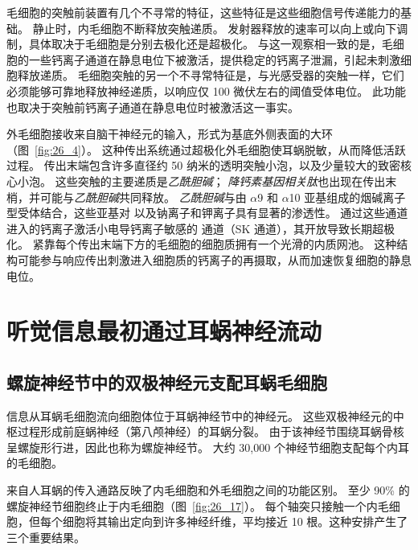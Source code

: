 毛细胞的突触前装置有几个不寻常的特征，这些特征是这些细胞信号传递能力的基础。
静止时，内毛细胞不断释放突触递质。
发射器释放的速率可以向上或向下调制，具体取决于毛细胞是分别去极化还是超极化。
与这一观察相一致的是，毛细胞的一些钙离子通道在静息电位下被激活，提供稳定的钙离子泄漏，引起未刺激细胞释放递质。
毛细胞突触的另一个不寻常特征是，与光感受器的突触一样，它们必须能够可靠地释放神经递质，以响应仅 100 微伏左右的阈值受体电位。
此功能也取决于突触前钙离子通道在静息电位时被激活这一事实。


外毛细胞接收来自脑干神经元的输入，形式为基底外侧表面的大环（图~\ref{fig:26_4}）。
这种传出系统通过超极化外毛细胞使耳蜗脱敏，从而降低活跃过程。
传出末端包含许多直径约 50 纳米的透明突触小泡，以及少量较大的致密核心小泡。
这些突触的主要递质是\textit{乙酰胆碱}；
\textit{降钙素基因相关肽}也出现在传出末梢，并可能与\textit{乙酰胆碱}共同释放。
\textit{乙酰胆碱}与由 $\alpha$9 和 $\alpha$10 亚基组成的烟碱离子型受体结合，这些亚基对  以及钠离子和钾离子具有显著的渗透性。
通过这些通道进入的钙离子激活小电导钙离子敏感的  通道（SK 通道），其开放导致长期超极化。
紧靠每个传出末端下方的毛细胞的细胞质拥有一个光滑的内质网池。
这种结构可能参与响应传出刺激进入细胞质的钙离子的再摄取，从而加速恢复细胞的静息电位。



\section{听觉信息最初通过耳蜗神经流动}

\subsection{螺旋神经节中的双极神经元支配耳蜗毛细胞}

信息从耳蜗毛细胞流向细胞体位于耳蜗神经节中的神经元。
这些双极神经元的中枢过程形成前庭蜗神经（第八颅神经）的耳蜗分裂。
由于该神经节围绕耳蜗骨核呈螺旋形行进，因此也称为螺旋神经节。
大约 30,000 个神经节细胞支配每个内耳的毛细胞。


来自人耳蜗的传入通路反映了内毛细胞和外毛细胞之间的功能区别。
至少 90\% 的螺旋神经节细胞终止于内毛细胞（图~\ref{fig:26_17}）。
每个轴突只接触一个内毛细胞，但每个细胞将其输出定向到许多神经纤维，平均接近 10 根。这种安排产生了三个重要结果。


